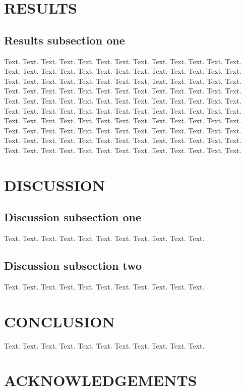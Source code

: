 \documentclass[a4,center,fleqn]{NAR}
\begin{document}
\section{RESULTS}

\subsection{Results subsection one}

Text. Text. Text. Text. Text. Text. Text. Text. Text. Text. Text.
Text. Text. Text. Text. Text. Text. Text. Text. Text. Text. Text.
Text. Text. Text. Text. Text. Text. Text. Text. Text. Text. Text.
Text. Text. Text. Text. Text. Text. Text. Text. Text. Text. Text.
Text. Text. Text. Text. Text. Text. Text. Text. Text. Text. Text.
Text. Text. Text. Text. Text. Text. Text. Text. Text. Text. Text.
Text. Text. Text. Text. Text. Text. Text. Text. Text. Text. Text.
Text. Text. Text. Text. Text. Text. Text. Text. Text. Text. Text.
Text. Text. Text. Text. Text. Text. Text. Text. Text. Text. Text.
Text. Text. Text. Text. Text. Text. Text. Text. Text. Text. Text.
Text. Text. Text. Text. Text. Text. Text. Text. Text. Text. Text.
Text. Text. Text. Text. Text. Text. Text. Text. Text.

\section{DISCUSSION}

\subsection{Discussion subsection one}

Text. Text. Text. Text. Text. Text. Text. Text. Text. Text. Text.

\subsection{Discussion subsection two}

Text. Text. Text. Text. Text. Text. Text. Text. Text. Text. Text.

\section{CONCLUSION}

Text. Text. Text. Text. Text. Text. Text. Text. Text. Text. Text.

\section{ACKNOWLEDGEMENTS}
\end{document}
